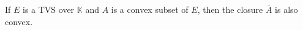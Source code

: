 If $E$ is a TVS over $\mathbb{K}$ and $A$ is a convex subset of $E$, then the closure $\overline{A}$ is also convex.